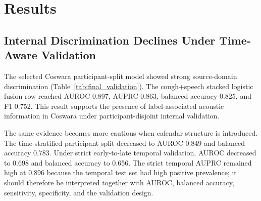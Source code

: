 \documentclass[preprint,12pt]{elsarticle}
\begin{document}
\section{Results}

\subsection{Internal Discrimination Declines Under Time-Aware Validation}

The selected Coswara participant-split model showed strong source-domain discrimination (Table~\ref{tab:final_validation}). The cough+speech stacked logistic fusion row reached AUROC 0.897, AUPRC 0.863, balanced accuracy 0.825, and F1 0.752. This result supports the presence of label-associated acoustic information in Coswara under participant-disjoint internal validation.

The same evidence becomes more cautious when calendar structure is introduced. The time-stratified participant split decreased to AUROC 0.849 and balanced accuracy 0.783. Under strict early-to-late temporal validation, AUROC decreased to 0.698 and balanced accuracy to 0.656. The strict temporal AUPRC remained high at 0.896 because the temporal test set had high positive prevalence; it should therefore be interpreted together with AUROC, balanced accuracy, sensitivity, specificity, and the validation design.

\begin{table}[t]
\centering
\caption{Final ComParE+IS10 validation results across participant, temporal, and external-transfer settings. Metrics are rounded to three decimals from the source result tables. Coswara rows evaluate source-domain multimodal or modality-specific endpoints; the COUGHVID row evaluates cough-only external transfer.}
\label{tab:final_validation}
\end{table}
\end{document}
